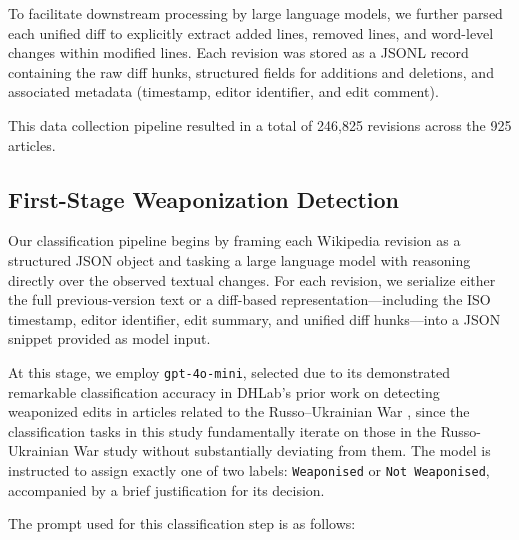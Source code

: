 \documentclass[11pt, a4paper, twoside, openright]{article} %
\begin{document}
To facilitate downstream processing by large language models, we further parsed each unified diff to explicitly extract added lines, removed lines, and word-level changes within modified lines. Each revision was stored as a JSONL record containing the raw diff hunks, structured fields for additions and deletions, and associated metadata (timestamp, editor identifier, and edit comment).

This data collection pipeline resulted in a total of 246{,}825 revisions across the 925 articles.

\subsection{First-Stage Weaponization Detection}

Our classification pipeline begins by framing each Wikipedia revision as a structured JSON object and tasking a large language model with reasoning directly over the observed textual changes. For each revision, we serialize either the full previous-version text or a diff-based representation—including the ISO timestamp, editor identifier, edit summary, and unified diff hunks—into a JSON snippet provided as model input.

At this stage, we employ \texttt{gpt-4o-mini}, selected due to its demonstrated remarkable classification accuracy in DHLab's prior work on detecting weaponized edits in articles related to the Russo–Ukrainian War \cite{hidri2025weaponization}, since the classification tasks in this study fundamentally iterate on those in the Russo-Ukrainian War study without substantially deviating from them. The model is instructed to assign exactly one of two labels: \texttt{Weaponised} or \texttt{Not Weaponised}, accompanied by a brief justification for its decision.

\lstset{
  basicstyle=\ttfamily\small, %
  frame=single,
  breaklines=true, %
  showstringspaces=false,
  tabsize=2
}

The prompt used for this classification step is as follows:
\end{document}
